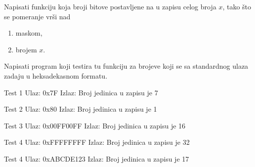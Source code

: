 \begin{Exercise}[label=202]
 Napisati funkciju koja broji bitove postavljene na  u zapisu celog broja $x$, tako što se pomeranje vrši nad
\begin{enumerate}
\item maskom,
\item brojem $x$.
\end{enumerate} 
 
 Napisati program koji testira tu funkciju za brojeve koji se sa standardnog ulaza zadaju u heksadekasnom formatu.

\begin{minitest}
\begin{test}{Test 1}
Ulaz:   0x7F  
Izlaz:  
  Broj jedinica u zapisu je  7   
\end{test}
\end{minitest}
\begin{minitest}
\begin{test}{Test 2}
Ulaz:   0x80
Izlaz:  
  Broj jedinica u zapisu je 1
\end{test}
\end{minitest}
\begin{minitest}
\begin{test}{Test 3}
Ulaz:   0x00FF00FF
Izlaz:  
  Broj jedinica u zapisu je 16
\end{test}
\end{minitest}

\begin{minitest}
\begin{test}{Test 4}
Ulaz:   0xFFFFFFFF
Izlaz:  
  Broj jedinica u zapisu je 32
\end{test}
\end{minitest}
\begin{minitest}
\begin{test}{Test 4}
Ulaz:   0xABCDE123
Izlaz:  
  Broj jedinica u zapisu je 17
\end{test}
\end{minitest}

\end{Exercise}
\begin{Answer}[ref=202]
\end{Answer}


